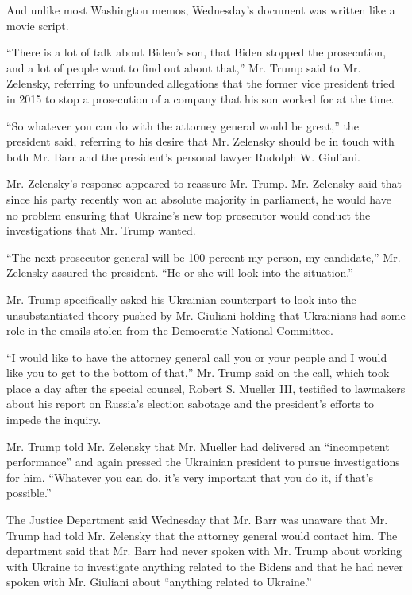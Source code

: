 And unlike most Washington memos, Wednesday's document was written like
a movie script.

``There is a lot of talk about Biden's son, that Biden stopped the
prosecution, and a lot of people want to find out about that,'' Mr.
Trump said to Mr. Zelensky, referring to unfounded allegations that the
former vice president tried in 2015 to stop a prosecution of a company
that his son worked for at the time.

``So whatever you can do with the attorney general would be great,'' the
president said, referring to his desire that Mr. Zelensky should be in
touch with both Mr. Barr and the president's personal lawyer Rudolph W.
Giuliani.

Mr. Zelensky's response appeared to reassure Mr. Trump. Mr. Zelensky
said that since his party recently won an absolute majority in
parliament, he would have no problem ensuring that Ukraine's new top
prosecutor would conduct the investigations that Mr. Trump wanted.

``The next prosecutor general will be 100 percent my person, my
candidate,'' Mr. Zelensky assured the president. ``He or she will look
into the situation.''

Mr. Trump specifically asked his Ukrainian counterpart to look into the
unsubstantiated theory pushed by Mr. Giuliani holding that Ukrainians
had some role in the emails stolen from the Democratic National
Committee.

``I would like to have the attorney general call you or your people and
I would like you to get to the bottom of that,'' Mr. Trump said on the
call, which took place a day after the special counsel, Robert S.
Mueller III, testified to lawmakers about his report on Russia's
election sabotage and the president's efforts to impede the inquiry.

Mr. Trump told Mr. Zelensky that Mr. Mueller had delivered an
``incompetent performance'' and again pressed the Ukrainian president to
pursue investigations for him. ``Whatever you can do, it's very
important that you do it, if that's possible.''

The Justice Department said Wednesday that Mr. Barr was unaware that Mr.
Trump had told Mr. Zelensky that the attorney general would contact him.
The department said that Mr. Barr had never spoken with Mr. Trump about
working with Ukraine to investigate anything related to the Bidens and
that he had never spoken with Mr. Giuliani about ``anything related to
Ukraine.''

